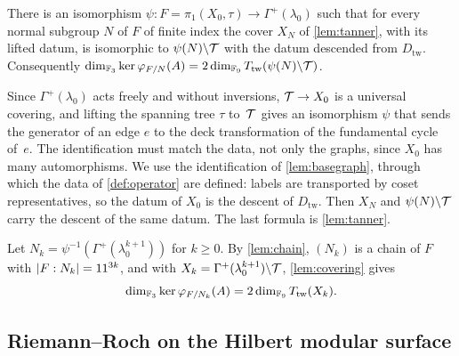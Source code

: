 \begin{lemma}\label{lem:covering}
\notformalized
There is an isomorphism $\psi\colon F=\pi_1(X_0,\tau)\to\Gamma^+(\lambda_0)$ such that for every normal subgroup $N$ of $F$
of finite index the cover $X_N$ of \cref{lem:tanner}, with its lifted datum, is isomorphic to $\psi(N)\backslash\mathcal{T}$ with
the datum descended from $D_{\mathrm{tw}}$. Consequently
$\dim_{\mathbb{F}_3}\ker\varphi_{F/N}(A)=2\dim_{\mathbb{F}_9}T_{\mathrm{tw}}(\psi(N)\backslash\mathcal{T})$.
\end{lemma}
\begin{informalproof}
Since $\Gamma^+(\lambda_0)$ acts freely and without inversions, $\mathcal{T}\to X_0$ is a universal covering, and lifting the
spanning tree $\tau$ to~$\mathcal{T}$ gives an isomorphism $\psi$ that sends the generator of an edge $e$ to the deck
transformation of the fundamental cycle of~$e$. The identification must match the data, not only the graphs, since $X_0$
has many automorphisms. We use the identification of \cref{lem:basegraph}, through which the data of \cref{def:operator}
are defined: labels are transported by coset representatives, so the datum of $X_0$ is the descent of $D_{\mathrm{tw}}$.
Then $X_N$ and $\psi(N)\backslash\mathcal{T}$ carry the descent of the same datum. The last formula is \cref{lem:tanner}.
\end{informalproof}

Let $N_k=\psi^{-1}(\Gamma^+(\lambda_0^{k+1}))$ for $k\ge0$. By \cref{lem:chain}, $(N_k)$ is a chain of $F$ with
$\lvert F:N_k \rvert=11^{3k}$, and with $X_k=\Gamma^+(\lambda_0^{k+1})\backslash\mathcal{T}$, \cref{lem:covering} gives
\begin{equation}\label{eq:H1}
  \dim_{\mathbb{F}_3}\ker\varphi_{F/N_k}(A)=2\dim_{\mathbb{F}_9}T_{\mathrm{tw}}(X_k).
\end{equation}

\subsection{Riemann--Roch on the Hilbert modular surface}\label{sec:RR}

